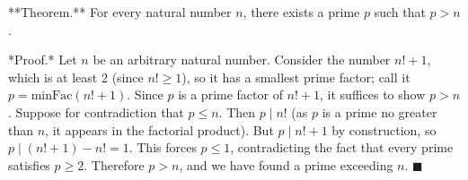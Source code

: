 **Theorem.** For every natural number $n$, there exists a prime $p$ such that $p > n$.

*Proof.* Let $n$ be an arbitrary natural number. Consider the number $n! + 1$, which is at least $2$ (since $n! \geq 1$), so it has a smallest prime factor; call it $p = \text{minFac}(n! + 1)$. Since $p$ is a prime factor of $n! + 1$, it suffices to show $p > n$. Suppose for contradiction that $p \leq n$. Then $p \mid n!$ (as $p$ is a prime no greater than $n$, it appears in the factorial product). But $p \mid n! + 1$ by construction, so $p \mid (n! + 1) - n! = 1$. This forces $p \leq 1$, contradicting the fact that every prime satisfies $p \geq 2$. Therefore $p > n$, and we have found a prime exceeding $n$. $\blacksquare$